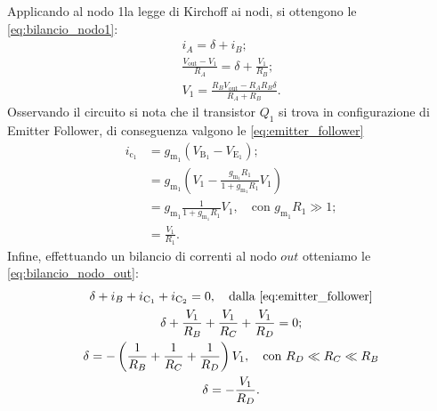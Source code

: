 Applicando al nodo 1la legge di Kirchoff ai nodi, si ottengono le \autoref*{eq:bilancio_nodo1}:
\begin{equation}
    \begin{gathered}
        i_A = \delta + i_B; \\
        \frac{V_\text{out} - V_1}{R_A} = \delta + \frac{V_1}{R_B}; \\
        V_1 = \frac{R_B V_\text{out} - R_A R_B \delta}{R_A + R_B}.
        \label{eq:bilancio_nodo1}
    \end{gathered}
\end{equation}
Osservando il circuito si nota che il transistor $Q_1$ si trova in configurazione di Emitter Follower, di conseguenza valgono le \autoref*{eq:emitter_follower}
\begin{equation}
    \begin{aligned}
        i_{\text{c}_1} &= g_{\text{m}_1} (V_{\text{B}_1} - V_{\text{E}_1});  \\
        &= g_{\text{m}_1} \left( V_1 - \frac{g_{\text{m}_1} R_1}{1 + g_{\text{m}_1} R_1} V_1 \right) \\
        &= g_{\text{m}_1} \frac{1}{1 + g_{\text{m}_1} R_1} V_1, \quad \text{con } g_{\text{m}_1} R_1 \gg 1 ;\\
        &= \frac{V_1}{R_1}.
    \end{aligned}
    \label{eq:emitter_follower}
\end{equation}
Infine, effettuando un bilancio di correnti al nodo $out$ otteniamo le \autoref*{eq:bilancio_nodo_out}:
\begin{equation}
    \begin{gathered}
        \delta + i_B + i_{\text{C}_1} + i_{\text{C}_2} = 0, \quad \text{dalla~\ref{eq:emitter_follower}} \\
        \delta + \frac{V_1}{R_B} + \frac{V_1}{R_C} + \frac{V_1}{R_D} = 0; \\
        \delta = -\left(\frac{1}{R_B} + \frac{1}{R_C} + \frac{1}{R_D}\right) V_1, \quad \text{con } R_D \ll R_C \ll R_B \\
        \delta = -\frac{V_1}{R_D}.
    \end{gathered}
    \label{eq:bilancio_nodo_out}
\end{equation}

